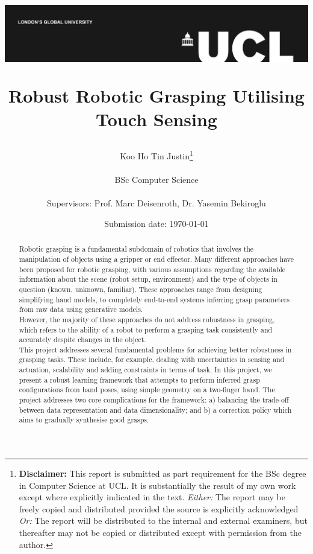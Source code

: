 \documentclass[12pt, a4paper]{report}
\title{{\vspace{-2in}\includegraphics[scale=0.4]{docs/Project Report/Media/ucl_logo.png}}\\
\vspace{2cm}
\begin{adjustwidth}{1cm}{1cm}
    \centering
    \Huge Robust Robotic Grasping Utilising Touch Sensing
\end{adjustwidth}}
\date{Submission date: \today}
\author{Koo Ho Tin Justin\thanks{
{\bf Disclaimer:}
This report is submitted as part requirement for the BSc degree in Computer Science at UCL. It is
substantially the result of my own work except where explicitly indicated in the text.
\emph{Either:} The report may be freely copied and distributed provided the source is explicitly acknowledged
\newline  %
\emph{Or:}\newline
The report will be distributed to the internal and external examiners, but thereafter may not be copied or distributed except with permission from the author.}
\\ \\
BSc Computer Science\\ \\
Supervisors: Prof. Marc Deisenroth, Dr. Yasemin Bekiroglu}
\theoremstyle{definition}
\begin{document}
\onehalfspacing
\maketitle


\begin{abstract}
Robotic grasping is a fundamental subdomain of robotics that involves the manipulation of objects using a gripper or end effector. Many different approaches have been proposed for robotic grasping, with various assumptions regarding the available information about the scene (robot setup, environment) and the type of objects in question (known, unknown, familiar). These approaches range from designing simplifying hand models, to completely end-to-end systems inferring grasp parameters from raw data using generative models.\\

However, the majority of these approaches do not address robustness in grasping, which refers to the ability of a robot to perform a grasping task consistently and accurately despite changes in the object.\\

This project addresses several fundamental problems for achieving better robustness in grasping tasks. These include, for example, dealing with uncertainties in sensing and actuation, scalability and adding constraints in terms of task. In this project, we present a robust learning framework that attempts to perform inferred grasp configurations from hand poses, using simple geometry on a two-finger hand. The project addresses two core complications for the framework: a) balancing the trade-off between data representation and data dimensionality; and b) a correction policy which aims to gradually synthesise good grasps.
\end{abstract}


\renewcommand\abstractname{Acknowledgments}
\begin{abstract}
    
\end{abstract}


\tableofcontents
\setcounter{page}{1}
\end{document}
